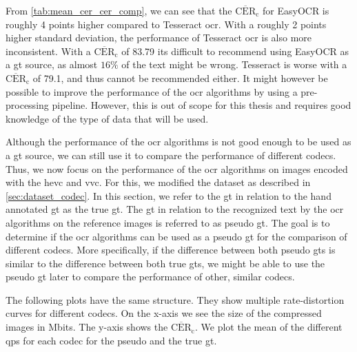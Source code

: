 From \autoref{tab:mean_cer_cer_comp}, we can see that the $\overline{\text{CER}}_{\text{c}}$ for EasyOCR is roughly 4 points higher compared to Tesseract \gls{ocr}.
With a roughly 2 points higher standard deviation, the performance of Tesseract \gls{ocr} is also more inconsistent.
With a $\overline{\text{CER}}_{\text{c}}$ of 83.79 its difficult to recommend using EasyOCR as a \gls{gt} source, as almost $16\%$ of the text might be wrong.
Tesseract is worse with a $\overline{\text{CER}}_{\text{c}}$ of 79.1, and thus cannot be recommended either.
It might however be possible to improve the performance of the \gls{ocr} algorithms by using a pre-processing pipeline.
However, this is out of scope for this thesis and requires good knowledge of the type of data that will be used.



Although the performance of the \gls{ocr} algorithms is not good enough to be used as a \gls{gt} source, we can still use it to compare the performance of different codecs.
Thus, we now focus on the performance of the \gls{ocr} algorithms on images encoded with the \gls{hevc} and \gls{vvc}.
For this, we modified the dataset as described in \autoref{sec:dataset_codec}.
In this section, we refer to the \gls{gt} in relation to the hand annotated \gls{gt} as the true \gls{gt}.
The \gls{gt} in relation to the recognized text by the \gls{ocr} algorithms on the reference images is referred to as pseudo \gls{gt}.
The goal is to determine if the \gls{ocr} algorithms can be used as a pseudo \gls{gt} for the comparison of different codecs.
More specifically, if the difference between both pseudo \glspl{gt} is similar to the difference between both true \glspl{gt}, we might be able to use the pseudo \gls{gt} later to compare the performance of other, similar codecs.

The following plots have the same structure.
They show multiple rate-distortion curves for different codecs.
On the x-axis we see the size of the compressed images in Mbits.
The y-axis shows the $\overline{\text{CER}}_{\text{c}}$.
We plot the mean of the different \glspl{qp} for each codec for the pseudo and the true \gls{gt}.



